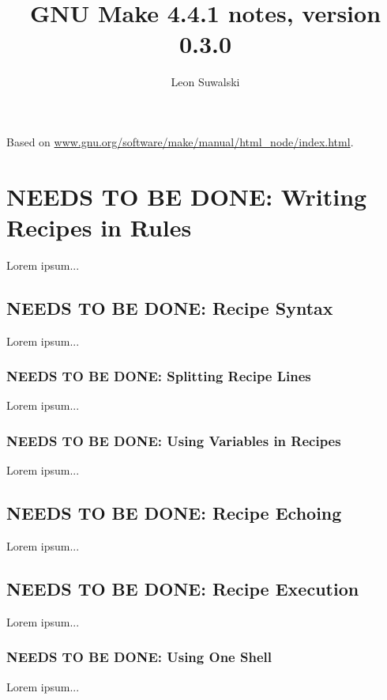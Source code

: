 \documentclass{charun}
\title{GNU Make 4.4.1 notes, version 0.3.0}
\author{Leon Suwalski}
\begin{document}
\begin{multicols*}{2}
\maketitle
\raggedright

Based on \url{www.gnu.org/software/make/manual/html_node/index.html}.







\color{gray}
\section{NEEDS TO BE DONE: Writing Recipes in Rules}
Lorem ipsum...
\color{black}

\color{gray}
\subsection{NEEDS TO BE DONE: Recipe Syntax}
Lorem ipsum...
\color{black}

\color{gray}
\subsubsection{NEEDS TO BE DONE: Splitting Recipe Lines}
Lorem ipsum...
\color{black}

\color{gray}
\subsubsection{NEEDS TO BE DONE: Using Variables in Recipes}
Lorem ipsum...
\color{black}

\color{gray}
\subsection{NEEDS TO BE DONE: Recipe Echoing}
Lorem ipsum...
\color{black}

\color{gray}
\subsection{NEEDS TO BE DONE: Recipe Execution}
Lorem ipsum...
\color{black}

\color{gray}
\subsubsection{NEEDS TO BE DONE: Using One Shell}
Lorem ipsum...
\color{black}


\end{multicols*}
\end{document}
